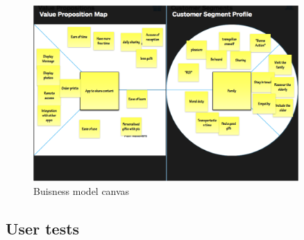 \begin{figure}[!htb]
    \centering
    \includegraphics[width=0.9\textwidth,keepaspectratio]{chap/marketFig/family_value_prop_canvas.png}
    \caption{Buisness model canvas}
    \label{fig:buisness model}
\end{figure}

\subsection{User tests}
